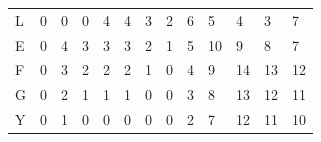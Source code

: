 \documentclass{bredelebeamer}
\begin{document}
\begin{frame}
\begin{table}[]
\begin{tabular}{lllllllllllll}
\multicolumn{1}{l|}{L}  & \multicolumn{1}{l|}{0} & \multicolumn{1}{l|}{0} & \multicolumn{1}{l|}{0} & \multicolumn{1}{l|}{4} & \multicolumn{1}{l|}{4}                         & \multicolumn{1}{l|}{3}                         & \multicolumn{1}{l|}{2}                         & \multicolumn{1}{l|}{\cellcolor[HTML]{3166FF}6} & \multicolumn{1}{l|}{5}                          & \multicolumn{1}{l|}{4}                          & \multicolumn{1}{l|}{3}  & \multicolumn{1}{l|}{7}  \\ \cline{2-13} 
\multicolumn{1}{l|}{E}  & \multicolumn{1}{l|}{0} & \multicolumn{1}{l|}{4} & \multicolumn{1}{l|}{3} & \multicolumn{1}{l|}{3} & \multicolumn{1}{l|}{3}                         & \multicolumn{1}{l|}{2}                         & \multicolumn{1}{l|}{1}                         & \multicolumn{1}{l|}{5}                         & \multicolumn{1}{l|}{\cellcolor[HTML]{3166FF}10} & \multicolumn{1}{l|}{9}                          & \multicolumn{1}{l|}{8}  & \multicolumn{1}{l|}{7}  \\ \cline{2-13} 
\multicolumn{1}{l|}{F}  & \multicolumn{1}{l|}{0} & \multicolumn{1}{l|}{3} & \multicolumn{1}{l|}{2} & \multicolumn{1}{l|}{2} & \multicolumn{1}{l|}{2}                         & \multicolumn{1}{l|}{1}                         & \multicolumn{1}{l|}{0}                         & \multicolumn{1}{l|}{4}                         & \multicolumn{1}{l|}{9}                          & \multicolumn{1}{l|}{\cellcolor[HTML]{3166FF}14} & \multicolumn{1}{l|}{13} & \multicolumn{1}{l|}{12} \\ \cline{2-13} 
\multicolumn{1}{l|}{G}  & \multicolumn{1}{l|}{0} & \multicolumn{1}{l|}{2} & \multicolumn{1}{l|}{1} & \multicolumn{1}{l|}{1} & \multicolumn{1}{l|}{1}                         & \multicolumn{1}{l|}{0}                         & \multicolumn{1}{l|}{0}                         & \multicolumn{1}{l|}{3}                         & \multicolumn{1}{l|}{8}                          & \multicolumn{1}{l|}{13}                         & \multicolumn{1}{l|}{12} & \multicolumn{1}{l|}{11} \\ \cline{2-13} 
\multicolumn{1}{l|}{Y}  & \multicolumn{1}{l|}{0} & \multicolumn{1}{l|}{1} & \multicolumn{1}{l|}{0} & \multicolumn{1}{l|}{0} & \multicolumn{1}{l|}{0}                         & \multicolumn{1}{l|}{0}                         & \multicolumn{1}{l|}{0}                         & \multicolumn{1}{l|}{2}                         & \multicolumn{1}{l|}{7}                          & \multicolumn{1}{l|}{12}                         & \multicolumn{1}{l|}{11} & \multicolumn{1}{l|}{10} \\ \cline{2-13} 
\end{tabular}
\end{table} 
\end{frame}
\end{document}

